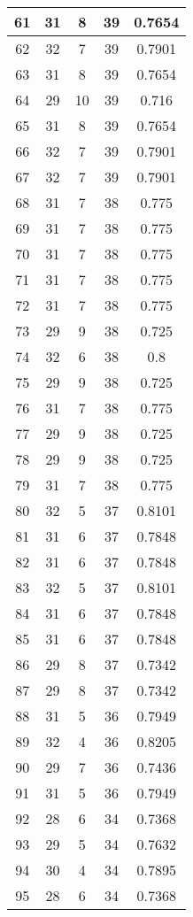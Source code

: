 \documentclass[letterpaper, 12pt]{article}
\begin{document}
\begin{longtable}{|c|c|c|c|c|}
61 & 31 & 8 & 39 & 0.7654 \\
\hline
62 & 32 & 7 & 39 & 0.7901 \\
\hline
63 & 31 & 8 & 39 & 0.7654 \\
\hline
64 & 29 & 10 & 39 & 0.716 \\
\hline
65 & 31 & 8 & 39 & 0.7654 \\
\hline
66 & 32 & 7 & 39 & 0.7901 \\
\hline
67 & 32 & 7 & 39 & 0.7901 \\
\hline
68 & 31 & 7 & 38 & 0.775 \\
\hline
69 & 31 & 7 & 38 & 0.775 \\
\hline
70 & 31 & 7 & 38 & 0.775 \\
\hline
71 & 31 & 7 & 38 & 0.775 \\
\hline
72 & 31 & 7 & 38 & 0.775 \\
\hline
73 & 29 & 9 & 38 & 0.725 \\
\hline
74 & 32 & 6 & 38 & 0.8 \\
\hline
75 & 29 & 9 & 38 & 0.725 \\
\hline
76 & 31 & 7 & 38 & 0.775 \\
\hline
77 & 29 & 9 & 38 & 0.725 \\
\hline
78 & 29 & 9 & 38 & 0.725 \\
\hline
79 & 31 & 7 & 38 & 0.775 \\
\hline
80 & 32 & 5 & 37 & 0.8101 \\
\hline
81 & 31 & 6 & 37 & 0.7848 \\
\hline
82 & 31 & 6 & 37 & 0.7848 \\
\hline
83 & 32 & 5 & 37 & 0.8101 \\
\hline
84 & 31 & 6 & 37 & 0.7848 \\
\hline
85 & 31 & 6 & 37 & 0.7848 \\
\hline
86 & 29 & 8 & 37 & 0.7342 \\
\hline
87 & 29 & 8 & 37 & 0.7342 \\
\hline
88 & 31 & 5 & 36 & 0.7949 \\
\hline
89 & 32 & 4 & 36 & 0.8205 \\
\hline
90 & 29 & 7 & 36 & 0.7436 \\
\hline
91 & 31 & 5 & 36 & 0.7949 \\
\hline
92 & 28 & 6 & 34 & 0.7368 \\
\hline
93 & 29 & 5 & 34 & 0.7632 \\
\hline
94 & 30 & 4 & 34 & 0.7895 \\
\hline
95 & 28 & 6 & 34 & 0.7368 \\

\end{longtable}
\end{document}
